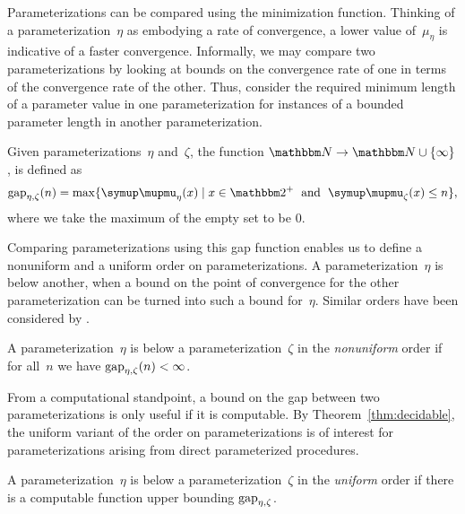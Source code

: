 Parameterizations can be compared using the minimization function.
Thinking of a parameterization~$\eta$ as embodying a rate of convergence, a lower value of~$\mu_\eta$ is indicative of a faster convergence.
Informally, we may compare two parameterizations by looking at bounds on the convergence rate of one in terms of the convergence rate of the other.
Thus, consider the required minimum length of a parameter value in one parameterization for instances of a bounded parameter length in another parameterization.
\begin{definition}
  Given parameterizations~$\eta$ and~$\zeta$, the  function $\bbN \to \bbN \cup \{\infty\}$, is defined as
  \begin{equation*}
    \gap_{\eta, \zeta}(n) \deq \max\{\mu_{\eta}(x) \st x \in \binary^+ \reland \mu_{\zeta}(x) \le n\},
  \end{equation*}
  where we take the maximum of the empty set to be $0$.
\end{definition}

Comparing parameterizations using this gap function enables us to define a nonuniform and a uniform order on parameterizations.
A parameterization~$\eta$ is below another, when a bound on the point of convergence for the other parameterization can be turned into such a bound for~$\eta$.
Similar orders have been considered by \textcite{komusiewicz2012new,fellows2013towards}.

\begin{definition}
  A parameterization~$\eta$ is below a parameterization~$\zeta$ in the \emph{nonuniform} order  if for all~$n$ we have $\operatorname{gap}_{\eta, \zeta}(n) < \infty$.
\end{definition}

From a computational standpoint, a bound on the gap between two parameterizations is only useful if it is computable.
By Theorem~\ref{thm:decidable}, the uniform variant of the order on parameterizations is of interest for parameterizations arising from direct parameterized procedures.

\begin{definition}
\label{def:uniform_order}%
  A parameterization~$\eta$ is below a parameterization~$\zeta$ in the \emph{uniform} order  if there is a computable function upper bounding $\operatorname{gap}_{\eta, \zeta}$.
\end{definition}

